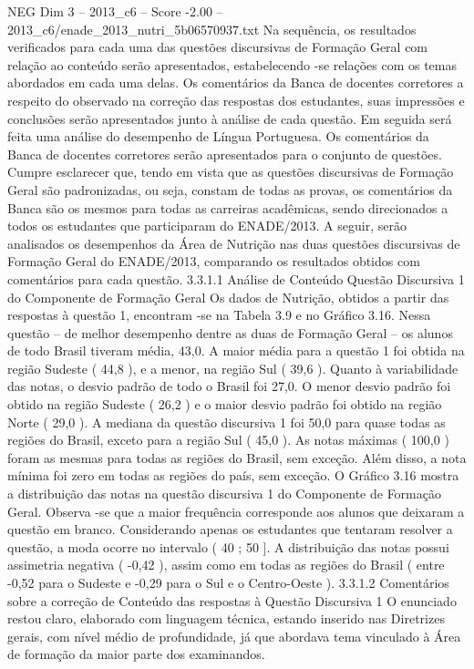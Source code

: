 \begin{textsample}{NEG Dim 3 – 2013\_c6 – Score -2.00 – 2013\_c6/enade\_2013\_nutri\_5b06570937.txt}
Na sequência, os resultados verificados para cada uma das questões discursivas de Formação Geral com relação ao conteúdo serão apresentados, estabelecendo -se relações com os temas abordados em cada uma delas.
Os comentários da Banca de docentes corretores a respeito do observado na correção das respostas dos estudantes, suas impressões e conclusões serão apresentados junto à análise de cada questão.
Em seguida será feita uma análise do desempenho de Língua Portuguesa.
Os comentários da Banca de docentes corretores serão apresentados para o conjunto de questões.
Cumpre esclarecer que, tendo em vista que as questões discursivas de Formação Geral são padronizadas, ou seja, constam de todas as provas, os comentários da Banca são os mesmos para todas as carreiras acadêmicas, sendo direcionados a todos os estudantes que participaram do ENADE/2013.
A seguir, serão analisados os desempenhos da Área de Nutrição nas duas questões discursivas de Formação Geral do ENADE/2013, comparando os resultados obtidos com comentários para cada questão. 3.3.1.1 Análise de Conteúdo Questão Discursiva 1 do Componente de Formação Geral Os dados de Nutrição, obtidos a partir das respostas à questão 1, encontram -se na Tabela 3.9 e no Gráfico 3.16.
Nessa questão – de melhor desempenho dentre as duas de Formação Geral – os alunos de todo Brasil tiveram média, 43,0.
A maior média para a questão 1 foi obtida na região Sudeste ( 44,8 ), e a menor, na região Sul ( 39,6 ).
Quanto à variabilidade das notas, o desvio padrão de todo o Brasil foi 27,0.
O menor desvio padrão foi obtido na região Sudeste ( 26,2 ) e o maior desvio padrão foi obtido na região Norte ( 29,0 ).
A mediana da questão discursiva 1 foi 50,0 para quase todas as regiões do Brasil, exceto para a região Sul ( 45,0 ).
As notas máximas ( 100,0 ) foram as mesmas para todas as regiões do Brasil, sem exceção.
Além disso, a nota mínima foi zero em todas as regiões do país, sem exceção.
O Gráfico 3.16 mostra a distribuição das notas na questão discursiva 1 do Componente de Formação Geral.
Observa -se que a maior frequência corresponde aos alunos que deixaram a questão em branco.
Considerando apenas os estudantes que tentaram resolver a questão, a moda ocorre no intervalo ( 40 ; 50 ].
A distribuição das notas possui assimetria negativa ( -0,42 ), assim como em todas as regiões do Brasil ( entre -0,52 para o Sudeste e -0,29 para o Sul e o Centro-Oeste ). 3.3.1.2 Comentários sobre a correção de Conteúdo das respostas à Questão Discursiva 1 O enunciado restou claro, elaborado com linguagem técnica, estando inserido nas Diretrizes gerais, com nível médio de profundidade, já que abordava tema vinculado à Área de formação da maior parte dos examinandos.

\end{textsample}
